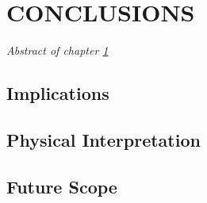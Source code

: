 \def\baselinestretch{1}
\chapter{CONCLUSIONS} \label{chap:conclusion}
    \minitoc
    \emph{Abstract of chapter \ref{chap:conclusion}}
    
    \section{Implications}
    
    \section{Physical Interpretation}
    
    \section{Future Scope}